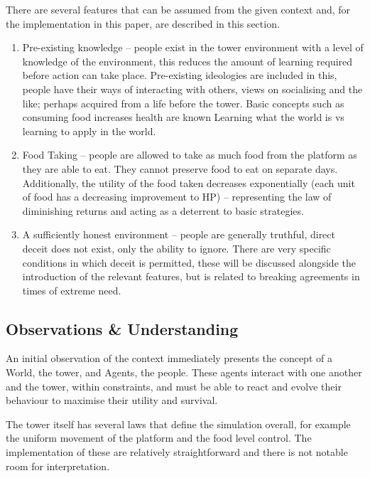 There are several features that can be assumed from the given context and, for the implementation in this paper, are described in this section.

\begin{enumerate}
    \item  Pre-existing knowledge – people exist in the tower environment with a level of knowledge of the environment, this reduces the amount of learning required before action can take place. Pre-existing ideologies are included in this, people have their ways of interacting with others, views on socialising and the like; perhaps acquired from a life before the tower.
     Basic concepts such as consuming food increases health are known
      Learning what the world is vs learning to apply in the world.
      \item  Food Taking – people are allowed to take as much food from the platform as they are able to eat. They cannot preserve food to eat on separate days. Additionally, the utility of the food taken decreases exponentially (each unit of food has a decreasing improvement to HP) – representing the law of diminishing returns and acting as a deterrent to basic strategies.
      \item A sufficiently honest environment – people are generally truthful, direct deceit does not exist, only the ability to ignore. There are very specific conditions in which deceit is permitted, these will be discussed alongside the introduction of the relevant features, but is related to breaking agreements in times of extreme need.

\end{enumerate}

\subsection{Observations \& Understanding}

An initial observation of the context immediately presents the concept of a World, the tower, and Agents, the people. These agents interact with one another and the tower, within constraints, and must be able to react and evolve their behaviour to maximise their utility and survival.
 
The tower itself has several laws that define the simulation overall, for example the uniform movement of the platform and the food level control. The implementation of these are relatively straightforward and there is not notable room for interpretation.
 
